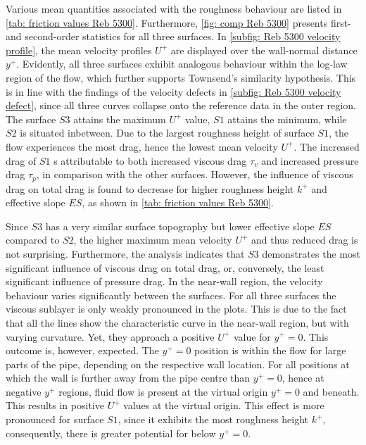Various mean quantities  associated with  the roughness behaviour are listed in \autoref{tab: friction values Reb 5300}.
Furthermore, \autoref{fig: comp Reb 5300} presents first- and second-order statistics for all three surfaces. 
In \autoref{subfig: Reb 5300 velocity profile}, the mean velocity profiles $U^+$ are displayed over the wall-normal distance $y^+$. 
Evidently, all three surfaces exhibit analogous  behaviour within the log-law region of the flow, which further supports Townsend's similarity hypothesis.
This is in line with the findings of the velocity defects in \autoref{subfig: Reb 5300 velocity defect}, since all three curves collapse onto the reference data in the outer region.
The surface $S3$ attains the maximum  $U^+$ value, $S1$ attains the minimum, while $S2$  is situated inbetween.
Due to the largest roughness height of surface $S1$, the flow experiences the most drag, hence the lowest mean velocity $U^+$.
The increased drag of $S1$ s attributable to both increased viscous drag $\tau_v$ and increased pressure drag $\tau_p$,  in comparison with the other surfaces.
However, the influence of viscous drag on total drag is found to decrease for higher roughness height $k^+$ and effective slope $ES$, as shown in \autoref{tab: friction values Reb 5300}. 

Since $S3$ has a very similar surface topography but lower effective slope $ES$ compared to $S2$, the higher maximum mean velocity $U^+$ and thus reduced drag is not surprising.
Furthermore, the analysis indicates that $S3$ demonstrates the most significant 
 influence of viscous drag on total drag, or, conversely, the least significant  influence of pressure drag.
In the near-wall region, the velocity behaviour varies significantly between the surfaces.
For all three surfaces the viscous sublayer is only weakly pronounced in the plots. This is due to the fact that all the lines show the characteristic curve in the near-wall region, but with varying curvature.
Yet, they approach a positive $U^+$ value for $y^+ = 0$.
This outcome is, however, expected.
The $y^+ = 0$ position is within the flow for large parts of the pipe, depending on the respective wall location.
For all positions at which the wall is further away from the pipe centre than $y^+ = 0$, hence at negative $y^+$ regions,  fluid flow is present at the virtual origin $y^+ = 0$ and beneath.
This results in positive $U^+$ values at the virtual origin. 
This effect is more pronounced for surface $S1$, since it exhibits the most roughness height $k^+$,  consequently, there is greater potential for  below $y^+ = 0$.

